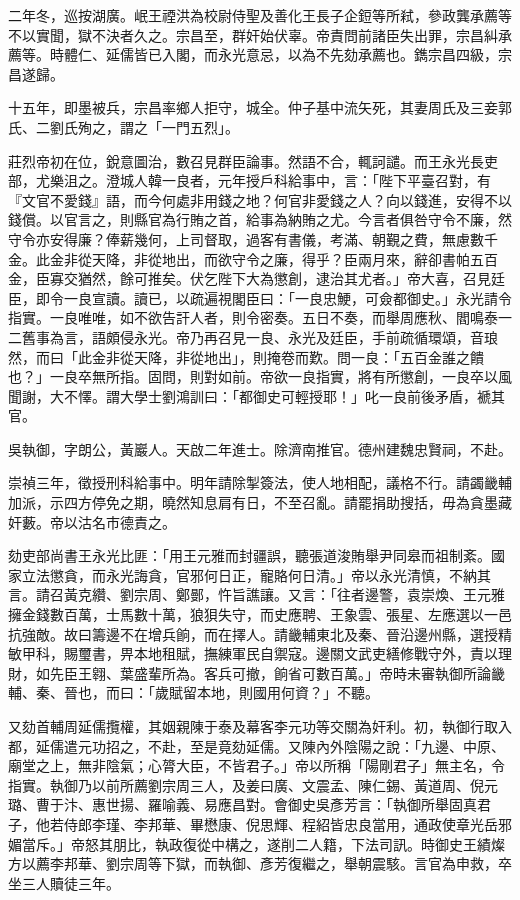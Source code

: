 \begin{pinyinscope}
二年冬，巡按湖廣。岷王禋洪為校尉侍聖及善化王長子企鋀等所弒，參政龔承薦等不以實聞，獄不決者久之。宗昌至，群奸始伏辜。帝責問前諸臣失出罪，宗昌糾承薦等。時體仁、延儒皆已入閣，而永光意忌，以為不先劾承薦也。鐫宗昌四級，宗昌遂歸。

十五年，即墨被兵，宗昌率鄉人拒守，城全。仲子基中流矢死，其妻周氏及三妾郭氏、二劉氏殉之，謂之「一門五烈」。

莊烈帝初在位，銳意圖治，數召見群臣論事。然語不合，輒訶譴。而王永光長吏部，尤樂沮之。澄城人韓一良者，元年授戶科給事中，言：「陛下平臺召對，有『文官不愛錢』語，而今何處非用錢之地？何官非愛錢之人？向以錢進，安得不以錢償。以官言之，則縣官為行賄之首，給事為納賄之尤。今言者俱咎守令不廉，然守令亦安得廉？俸薪幾何，上司督取，過客有書儀，考滿、朝覲之費，無慮數千金。此金非從天降，非從地出，而欲守令之廉，得乎？臣兩月來，辭卻書帕五百金，臣寡交猶然，餘可推矣。伏乞陛下大為懲創，逮治其尤者。」帝大喜，召見廷臣，即令一良宣讀。讀已，以疏遍視閣臣曰：「一良忠鯁，可僉都御史。」永光請令指實。一良唯唯，如不欲告訐人者，則令密奏。五日不奏，而舉周應秋、閻鳴泰一二舊事為言，語頗侵永光。帝乃再召見一良、永光及廷臣，手前疏循環頌，音琅然，而曰「此金非從天降，非從地出」，則掩卷而歎。問一良：「五百金誰之饋也？」一良卒無所指。固問，則對如前。帝欲一良指實，將有所懲創，一良卒以風聞謝，大不懌。謂大學士劉鴻訓曰：「都御史可輕授耶！」叱一良前後矛盾，褫其官。

吳執御，字朗公，黃巖人。天啟二年進士。除濟南推官。德州建魏忠賢祠，不赴。

崇禎三年，徵授刑科給事中。明年請除掣簽法，使人地相配，議格不行。請蠲畿輔加派，示四方停免之期，曉然知息肩有日，不至召亂。請罷捐助搜括，毋為貪墨藏奸藪。帝以沽名市德責之。

劾吏部尚書王永光比匪：「用王元雅而封疆誤，聽張道浚賄舉尹同皋而祖制紊。國家立法懲貪，而永光誨貪，官邪何日正，寵賂何日清。」帝以永光清慎，不納其言。請召黃克纘、劉宗周、鄭鄤，忤旨譙讓。又言：「往者邊警，袁崇煥、王元雅擁金錢數百萬，士馬數十萬，狼狽失守，而史應聘、王象雲、張星、左應選以一邑抗強敵。故曰籌邊不在增兵餉，而在擇人。請畿輔東北及秦、晉沿邊州縣，選授精敏甲科，賜璽書，畀本地租賦，撫練軍民自禦寇。邊關文武吏繕修戰守外，責以理財，如先臣王翱、葉盛輩所為。客兵可撤，餉省可數百萬。」帝時未審執御所論畿輔、秦、晉也，而曰：「歲賦留本地，則國用何資？」不聽。

又劾首輔周延儒攬權，其姻親陳于泰及幕客李元功等交關為奸利。初，執御行取入都，延儒遣元功招之，不赴，至是竟劾延儒。又陳內外陰陽之說：「九邊、中原、廟堂之上，無非陰氣；心膂大臣，不皆君子。」帝以所稱「陽剛君子」無主名，令指實。執御乃以前所薦劉宗周三人，及姜曰廣、文震孟、陳仁錫、黃道周、倪元璐、曹于汴、惠世揚、羅喻義、易應昌對。會御史吳彥芳言：「執御所舉固真君子，他若侍郎李瑾、李邦華、畢懋康、倪思輝、程紹皆忠良當用，通政使章光岳邪媚當斥。」帝怒其朋比，執政復從中構之，遂削二人籍，下法司訊。時御史王績燦方以薦李邦華、劉宗周等下獄，而執御、彥芳復繼之，舉朝震駭。言官為申救，卒坐三人贖徒三年。


\end{pinyinscope}
